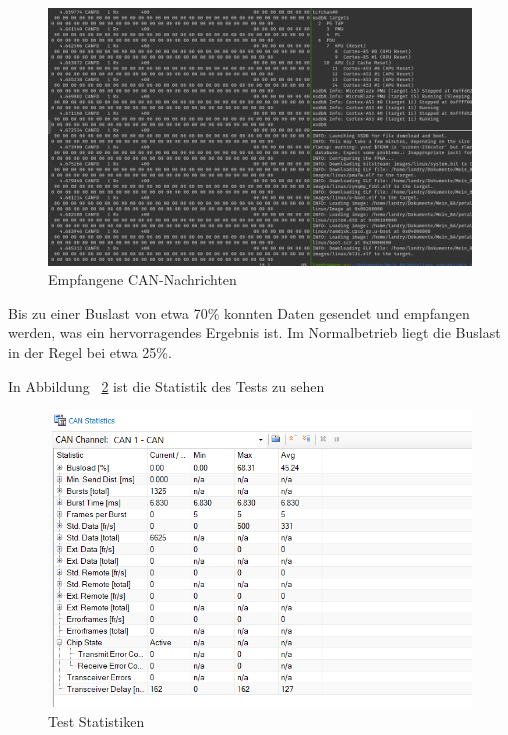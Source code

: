 \begin{figure}[H]
	\begin{center}		\includegraphics[width=1\textwidth]{./images/can_bootschaften.jpg}
	\end{center}
	\vspace{-5pt}
	\caption[Empfangene CAN-Nachrichten]{Empfangene CAN-Nachrichten} %
	\label{fig:empfangene:can:nachrichten}
	\vspace{-5pt}
\end{figure}
Bis zu einer Buslast von etwa 70\% konnten Daten gesendet und empfangen werden, was ein hervorragendes Ergebnis ist. Im Normalbetrieb liegt die Buslast in der Regel bei etwa 25\%. 

In Abbildung ~\ref{fig:can:statistiken} ist die Statistik des Tests zu sehen
\begin{figure}[H]
	\begin{center}		\includegraphics[width=1\textwidth]{./images/can_statistik.jpg}
	\end{center}
	\vspace{-5pt}
	\caption[Test Statistiken]{Test Statistiken} %
	\label{fig:can:statistiken}
	\vspace{-5pt}
\end{figure}